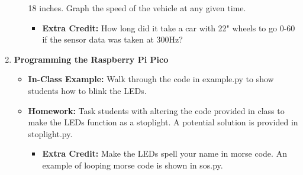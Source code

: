 \begin{enumerate}
\begin{itemize}
            18 inches. Graph the speed of the vehicle at any 
            given time.
                \begin{itemize}
                    \item \textbf{Extra Credit:} How long did 
                    it take a car with 22" wheels to go 0-60 
                    if the sensor data was taken at 300Hz?
                \end{itemize}
        \end{itemize}
    \item \textbf{Programming the Raspberry Pi Pico}
        \begin{itemize}
            \item \textbf{In-Class Example:} Walk through the code 
            in example.py to show students how to blink the LEDs. 
            \item \textbf{Homework:} Task students with altering 
            the code provided in class to make the LEDs function 
            as a stoplight. A potential solution is provided in 
            stoplight.py.
            \begin{itemize}
                \item \textbf{Extra Credit:} Make the LEDs spell 
                your name in morse code. An example of looping morse
                code is shown in sos.py.
            \end{itemize}
        \end{itemize}
\end{enumerate}

